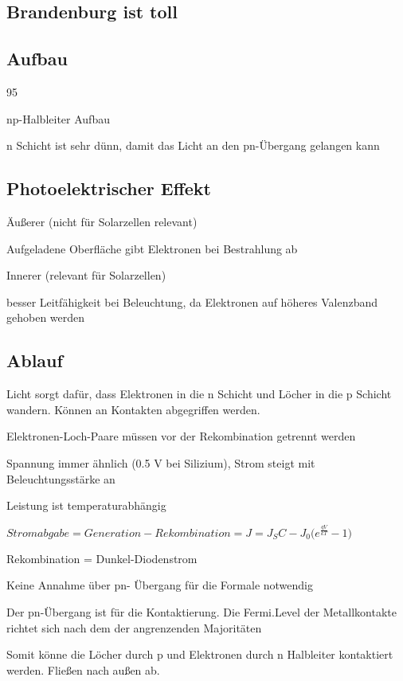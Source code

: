 \subsection{Brandenburg ist toll}


\subsection{Aufbau}

95%

np-Halbleiter Aufbau

n Schicht ist sehr dünn, damit das Licht an den pn-Übergang gelangen kann


\subsection{Photoelektrischer Effekt}

Äußerer (nicht für Solarzellen relevant)

Aufgeladene Oberfläche gibt Elektronen bei Bestrahlung ab

Innerer (relevant für Solarzellen)

besser Leitfähigkeit bei Beleuchtung, da Elektronen auf höheres Valenzband gehoben werden


\subsection{Ablauf}

Licht sorgt dafür, dass Elektronen in die n Schicht und Löcher in die p Schicht wandern. Können an Kontakten abgegriffen werden.

Elektronen-Loch-Paare müssen vor der Rekombination getrennt werden

Spannung immer ähnlich (0.5 V bei Silizium), Strom steigt mit Beleuchtungsstärke an

Leistung ist temperaturabhängig


$Stromabgabe = Generation - Rekombination = J = J_SC - J_0 \bigg(e^{\frac{qV}{kT}}-1\bigg)$

Rekombination = Dunkel-Diodenstrom

Keine Annahme über pn- Übergang für die Formale notwendig


Der pn-Übergang ist für die Kontaktierung. Die Fermi.Level der Metallkontakte richtet sich nach dem der angrenzenden Majoritäten

Somit könne die Löcher durch p und Elektronen durch n Halbleiter kontaktiert werden. Fließen nach außen ab.


